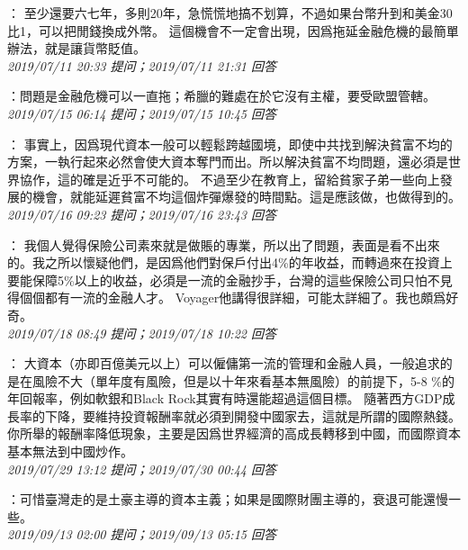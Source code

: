 \documentclass[twocolumn]{ctexart}
\begin{document}
：
至少還要六七年，多則20年，急慌慌地搞不划算，不過如果台幣升到和美金30比1，可以把閒錢換成外幣。
這個機會不一定會出現，因爲拖延金融危機的最簡單辦法，就是讓貨幣貶值。
\\

\textit{\hfill\noindent\small 2019/07/11 20:33 提问；2019/07/11 21:31 回答}

：問題是金融危機可以一直拖；希臘的難處在於它沒有主權，要受歐盟管轄。
\\

\textit{\hfill\noindent\small 2019/07/15 06:14 提问；2019/07/15 10:45 回答}

：
事實上，因爲現代資本一般可以輕鬆跨越國境，即使中共找到解決貧富不均的方案，一執行起來必然會使大資本奪門而出。所以解決貧富不均問題，還必須是世界協作，這的確是近乎不可能的。
不過至少在教育上，留給貧家子弟一些向上發展的機會，就能延遲貧富不均這個炸彈爆發的時間點。這是應該做，也做得到的。
\\

\textit{\hfill\noindent\small 2019/07/16 09:23 提问；2019/07/16 23:43 回答}

：
我個人覺得保險公司素來就是做賬的專業，所以出了問題，表面是看不出來的。我之所以懷疑他們，是因爲他們對保戶付出4\%的年收益，而轉過來在投資上要能保障5\%以上的收益，必須是一流的金融抄手，台灣的這些保險公司只怕不見得個個都有一流的金融人才。
Voyager他講得很詳細，可能太詳細了。我也頗爲好奇。
\\

\textit{\hfill\noindent\small 2019/07/18 08:49 提问；2019/07/18 10:22 回答}

：
大資本（亦即百億美元以上）可以僱傭第一流的管理和金融人員，一般追求的是在風險不大（單年度有風險，但是以十年來看基本無風險）的前提下，5-8 \%的年回報率，例如軟銀和Black Rock其實有時還能超過這個目標。 
隨著西方GDP成長率的下降，要維持投資報酬率就必須到開發中國家去，這就是所謂的國際熱錢。你所舉的報酬率降低現象，主要是因爲世界經濟的高成長轉移到中國，而國際資本基本無法到中國炒作。
\\

\textit{\hfill\noindent\small 2019/07/29 13:12 提问；2019/07/30 00:44 回答}

：可惜臺灣走的是土豪主導的資本主義；如果是國際財團主導的，衰退可能還慢一些。
\\

\textit{\hfill\noindent\small 2019/09/13 02:00 提问；2019/09/13 05:15 回答}
\end{document}
